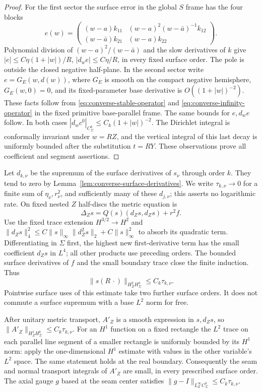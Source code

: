 \documentclass[11pt]{amsart}
\theoremstyle{definition}
\theoremstyle{remark}
\theoremstyle{plain}
\begin{document}
\begin{proof}
For the first sector the surface error in the global $S$ frame
has the four blocks
\[
 e(w)=
 \begin{pmatrix}
 (w-a)k_{11}&(w-a)^2(w-\bar a)^{-1}k_{12}\\
 (w-\bar a)k_{21}&(w-a)k_{22}
 \end{pmatrix}.
\]
Polynomial division of $(w-a)^2/(w-\bar a)$ and the slow
derivatives of $k$ give
$|e|\leq C\eta(1+|w|)/R$, $|d_we|\leq C\eta/R$,
in every fixed surface order. The pole is outside the closed
negative half-plane. In the second sector write $e=G_E(w,d(w))$,
where $G_E$ is smooth on the compact negative hemisphere,
$G_E(w,0)=0$, and its fixed-parameter base derivative is
$O((1+|w|)^{-2})$. These facts follow from
\eqref{eq:converse-stable-operator} and
\eqref{eq:converse-infinity-operator} in the fixed primitive
base-parallel frame. The same bounds for $e,d_we$ follow.
In both cases
$|d_wc^0|_{C_\Sigma^k}\leq C_k(1+|w|)^{-2}$.
The Dirichlet integral is conformally invariant under $w=RZ$,
and the vertical integral of this last decay is uniformly
bounded after the substitution $t=RY$.
These observations prove all coefficient and segment assertions.
\end{proof}

Let $d_{k,\nu}$ be the supremum of the surface derivatives of
$s_\nu$ through order $k$. They tend to zero by
Lemma~\ref{lem:converse-surface-derivatives}. We write
$\tau_{k,\nu}\to0$ for a finite sum of $\eta_\nu,r_\nu^2$,
and sufficiently many of these $d_{j,\nu}$; this asserts no
logarithmic rate. On fixed nested $Z$ half-discs the metric equation
is
\[
                  \Delta_Zs=Q(s)(d_Zs,d_Zs)+r^2f.
\]
Use the fixed trace extension $H^{3/2}\to H^2$ and
$\|d_Zs\|_4^2\leq C\|s\|_\infty\|d_Z^2s\|_2+C\|s\|_\infty^2$
to absorb its quadratic term. Differentiating in $\Sigma$ first,
the highest new first-derivative term has the small coefficient
$d_Zs$ in $L^4$; all other products use preceding orders.
The bounded surface derivatives of $f$ and the small boundary
trace close the finite induction. Thus
\begin{equation}\label{eq:converse-large-metric}
                   \|s(R\,\cdot)\|_{H_Z^2H_\Sigma^k}
                                           \leq C_k\tau_{k,\nu}.
\end{equation}
Pointwise surface uses of this estimate take two further surface
orders. It does not commute a surface supremum with a base
$L^2$ norm for free.

After unitary metric transport, $A'_Z$ is a smooth expression
in $s,d_Zs$, so $\|A'_Z\|_{H_Z^1H_\Sigma^k}\leq C_k\tau_{k,\nu}$.
For an $H^1$ function on a fixed rectangle the $L^2$ trace on
each parallel line segment of a smaller rectangle is uniformly
bounded by its $H^1$ norm: apply the one-dimensional $H^1$
estimate with values in the other variable's $L^2$ space.
The same statement holds at the real boundary. Consequently
the seam and normal transport integrals of $A'_Z$ are small,
in every prescribed surface order. The axial gauge $g$ based
at the seam center satisfies
$\|g-I\|_{L_Z^\infty C_\Sigma^k}\leq C_k\tau_{k,\nu}$.
\end{document}
